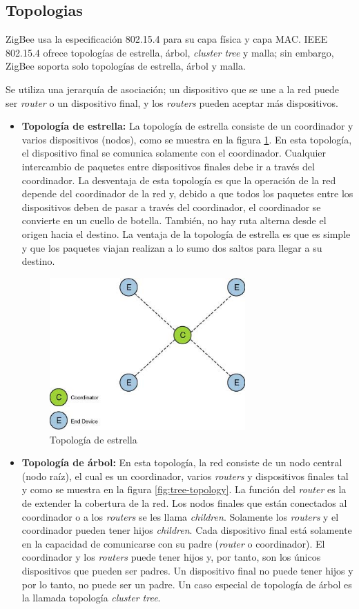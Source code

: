 \documentclass[10pt,journal,compsoc]{IEEEtran}
\begin{document}
\subsection{Topologias}
ZigBee usa la especificación 802.15.4 para su capa física y capa MAC. IEEE 802.15.4 ofrece topologías de estrella, árbol, \emph{cluster tree} y malla; sin embargo, ZigBee soporta solo topologías de estrella, árbol y malla.

Se utiliza una jerarquía de asociación; un dispositivo que se une a la red puede ser \emph{router} o un dispositivo final, y los \emph{routers} pueden aceptar más dispositivos.

\begin{itemize}
    \item \textbf{Topología de estrella:} La topología de estrella consiste de un coordinador y varios dispositivos (nodos), como se muestra en la figura \ref{fig:star-topology}. En esta topología, el dispositivo final se comunica solamente con el coordinador. Cualquier intercambio de paquetes entre dispositivos finales debe ir a través del coordinador. La desventaja de esta topología es que la operación de la red depende del coordinador de la red y, debido a que todos los paquetes entre los dispositivos deben de pasar a través del coordinador, el coordinador se convierte en un cuello de botella. También, no hay ruta alterna desde el origen hacia el destino. La ventaja de la topología de estrella es que es simple y que los paquetes viajan realizan a lo sumo dos saltos para llegar a su destino.
    \begin{figure}[h]
        \centering
        \includegraphics[width=7.5cm]{star-topology}
        \caption{Topología de estrella}
        \label{fig:star-topology}
    \end{figure}
    \item \textbf{Topología de árbol:} En esta topología, la red consiste de un nodo central (nodo raíz), el cual es un coordinador, varios \emph{routers} y dispositivos finales tal y como se muestra en la figura \ref{fig:tree-topology}. La función del \emph{router} es la de extender la cobertura de la red. Los nodos finales que están conectados al coordinador o a los \emph{routers} se les llama \emph{children}. Solamente los \emph{routers} y el coordinador pueden tener  hijos \emph{children}. Cada dispositivo final está solamente en la capacidad de comunicarse con su padre (\emph{router} o coordinador). El coordinador y los \emph{routers} puede tener hijos y, por tanto, son los únicos dispositivos que pueden ser padres. Un dispositivo final no puede tener hijos y por lo tanto, no puede ser un padre. Un caso especial de topología de árbol es la llamada topología \emph{cluster tree}.

\end{itemize}
\end{document}
